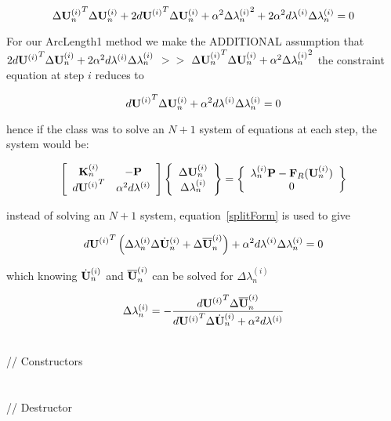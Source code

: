 \begin{enumerate}
\[
\Delta {{\bf U}_n^{(i)}}^T\Delta {\bf U}_n^{(i)} + 2{d{\bf U}^{(i)}}^T\Delta {\bf U}_n^{(i)} + 
\alpha^2 \Delta {\lambda_n^{(i)}}^2
+ 2 \alpha^2 d\lambda^{(i)} \Delta \lambda_n^{(i)} 
= 0
\]

 \noindent For our ArcLength1 method we make the ADDITIONAL assumption that
$ 2{d{\bf U}^{(i)}}^T\Delta {\bf U}_n^{(i)} 
+ 2 \alpha^2 d\lambda^{(i)} \Delta \lambda_n^{(i)} $ $>>$
$ 
\Delta {{\bf U}_n^{(i)}}^T\Delta {\bf U}_n^{(i)} +
\alpha^2 \Delta {\lambda_n^{(i)}}^2
$
the constraint equation at step $i$ reduces to

\[
{d{\bf U}^{(i)}}^T\Delta {\bf U}_n^{(i)} 
+ \alpha^2 d\lambda^{(i)} \Delta \lambda_n^{(i)} = 0
\]

\noindent hence if the class was to solve an $N+1$ system of equations at
each step, the system would be:

\[ \left[
\begin{array}{cc}
{\bf K}_n^{(i)} & -{\bf P} \\
{d{\bf U}^{(i)}}^T & \alpha^2 d\lambda^{(i)} 
\end{array} \right] 
\left\{
\begin{array}{c}
\Delta {\bf U}_n^{(i)} \\
\Delta \lambda_n^{(i)}
\end{array} \right\} = \left\{
\begin{array}{c}
\lambda_n^{(i)} {\bf P} - {\bf F}_R({\bf U}_n^{(i)}) \\
0
\end{array} \right\}
\]

\noindent instead of solving an $N+1$ system, equation~\ref{splitForm}
is used to give

\[
{d{\bf U}^{(i)}}^T \left(\Delta \lambda_n^{(i)} \Delta \dot{\bf U}_n^{(i)} + \Delta
\overline{\bf U}_n^{(i)}\right) 
+ \alpha^2 d\lambda^{(i)} \Delta \lambda_n^{(i)} = 0
\]

\noindent which knowing $\dot{\bf U}_n^{(i)}$ and $\overline{\bf U}_n^{(i)}$ can
be solved for $\Delta \lambda_n^{(i)}$ 

\[
\Delta \lambda_n^{(i)} = -\frac{{d{\bf U}^{(i)}}^T \Delta \overline{\bf U}_n^{(i)}}{{d{\bf U}^{(i)}}^T \Delta
\dot{\bf U}_n^{(i)} + \alpha^2 d\lambda^{(i)}}
\]

\end{enumerate}
 \\
\indent // Constructors \\
\\ \\
\indent // Destructor \\
\\  \\
